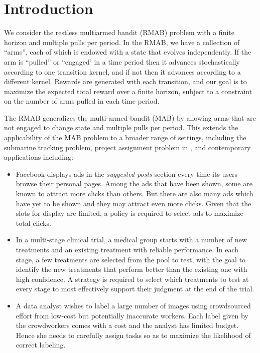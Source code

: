 \section{Introduction}\label{intro}
We consider the restless multiarmed bandit (RMAB) problem \citep{whittle1988} with a finite horizon and multiple pulls per period.  In the RMAB, we have a collection of ``arms'', each of which is endowed with a state that evolves independently.  If the arm is ``pulled'' or ``engaged' in a time period then it advances stochastically according to one transition kernel, and if not then it advances according to a different kernel.  Rewards are generated with each transition, and our goal is to maximize the expected total reward over a finite horizon, subject to a constraint on the number of arms pulled in each time period.

The RMAB generalizes the multi-armed bandit (MAB) \citep{robbins195x} by allowing arms that are not engaged to change state and multiple pulls per period. 
This extends the applicability of the MAB problem to a broader range of settings, including the submarine tracking problem, project assignment problem in \citep{whittle1988}, 
and contemporary applications including:
\begin{itemize}
\item Facebook displays ads in the \textit{suggested posts} section every time its users browse their personal pages. Among the ads that have been shown, some are known to attract more clicks than others. But there are also many ads which have yet to be shown and they may attract even more clicks. Given that the slots for display are limited, a policy is required to select ads to maximize total clicks.
\item In a multi-stage clinical trial, a medical group starts with a number of new treatments and an existing treatment with reliable performance. In each stage, a few treatments are selected from the pool to test, with the goal to identify the new treatments that perform better than the existing one with high confidence. A strategy is required to select which treatments to test at every stage to most effectively support their judgment at the end of the trial. 
\item A data analyst wishes to label a large number of images using crowdsourced effort from low-cost but potentially inaccurate workers. Each label given by the crowdworkers comes with a cost and the analyst has limited budget. Hence she needs to carefully assign tasks so as to maximize the likelihood of correct labeling.
\end{itemize}

